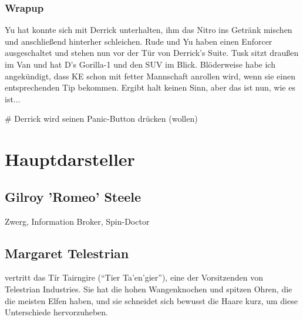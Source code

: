 \subsubsection{Wrapup}

Yu hat konnte sich mit Derrick unterhalten, ihm das Nitro ins Getränk mischen und anschließend hinterher schleichen. Rude und Yu haben einen Enforcer ausgeschaltet und stehen nun vor der Tür von Derrick's Suite. Tusk sitzt draußen im Van und hat D's Gorilla-1 und den SUV im Blick. Blöderweise habe ich angekündigt, dass KE schon mit fetter Mannschaft anrollen wird, wenn sie einen entsprechenden Tip bekommen. Ergibt halt keinen Sinn, aber das ist nun, wie es ist...

\begin{easylist}
    # Derrick wird seinen Panic-Button drücken (wollen)
\end{easylist}





\clearpage
\section{Hauptdarsteller}

\subsection{Gilroy 'Romeo' Steele}

Zwerg, Information Broker, Spin-Doctor

\subsection{Margaret Telestrian}

vertritt das Tír Tairngire (``Tier Ta'en'gier''), eine der Vorsitzenden von Telestrian Industries.
Sie hat die hohen Wangenknochen und spitzen Ohren, die die meisten Elfen haben, und sie schneidet sich bewusst die Haare kurz, um diese Unterschiede hervorzuheben.
